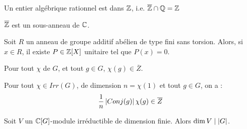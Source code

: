\documentclass{cours}
\begin{document}
\begin{proposition}
    Un entier algébrique rationnel est dans $\mathbb{Z}$, i.e. $\overline{\mathbb{Z}} \cap \mathbb{Q} = \mathbb{Z}$
\end{proposition}
\begin{proposition}
    $\overline{\mathbb{Z}}$ est un sous-anneau de $\mathbb{C}$. 
\end{proposition}

\begin{proposition}
    Soit $R$ un anneau de groupe additif abélien de type fini sans torsion. Alors, si $x \in R$, il existe $P \in \mathbb{Z}[X]$ unitaire tel que $P(x) = 0$.
\end{proposition}

\begin{proposition}
    Pour tout $\chi$ de $G$, et tout $g \in G$, $\chi(g) \in \overline{Z}$.
\end{proposition}

\begin{proposition}
    Pour tout $\chi \in Irr(G)$, de dimension $n = \chi(1)$ et tout $g \in G$, on a : 
    \[
        \frac{1}{n}\left|Conj(g)\right| \chi(g) \in \overline{Z}
    \]
\end{proposition}

\begin{theorem}
    Soit $V$ un $\mathbb{C}[G]$-module irréductible de dimension finie. Alors $\dim V \mid \left|G\right|$.
\end{theorem}
\end{document}
